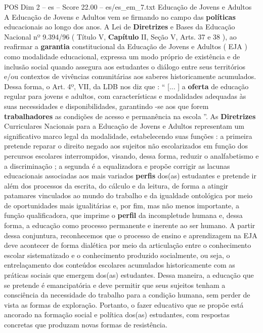 \begin{textsample}{POS Dim 2 – es – Score 22.00 – es/es\_em\_7.txt}  \label{ex:f2_pos_213}
Educação de Jovens e Adultos A Educação de Jovens e Adultos vem se firmando no campo das \textbf{políticas} educacionais ao longo dos anos.
A Lei de \textbf{Diretrizes} e Bases da Educação Nacional nº 9.394/96 ( Título V, \textbf{Capítulo} II, Seção V, Arts. 37 e 38 ), ao reafirmar a \textbf{garantia} constitucional da Educação de Jovens e Adultos ( EJA ) como modalidade educacional, expressa um modo próprio de existência e de inclusão social quando assegura aos estudantes o diálogo entre seus territórios e/ou contextos de vivências comunitárias aos saberes historicamente acumulados.
Dessa forma, o Art. 4º, VII, da LDB nos diz que : “ [... ] a \textbf{oferta} de educação regular para jovens e adultos, com características e modalidades adequadas às suas necessidades e disponibilidades, garantindo -se aos que forem \textbf{trabalhadores} as condições de acesso e permanência na escola ”.
As \textbf{Diretrizes} Curriculares Nacionais para a Educação de Jovens e Adultos representam um significativo marco legal da modalidade, estabelecendo suas funções : a primeira pretende reparar o direito negado aos sujeitos não escolarizados em função dos percursos escolares interrompidos, visando, dessa forma, reduzir o analfabetismo e a discriminação ; a segunda é a equalizadora e propõe corrigir as lacunas educacionais associadas aos mais variados \textbf{perfis} dos(as) estudantes e pretende ir além dos processos da escrita, do cálculo e da leitura, de forma a atingir patamares vinculados ao mundo do trabalho e da igualdade ontológica por meio de oportunidades mais igualitárias e, por fim, mas não menos importante, a função qualificadora, que imprime o \textbf{perfil} da incompletude humana e, dessa forma, a educação como processo permanente e inerente ao ser humano.
A partir dessa conjuntura, reconhecemos que o processo de ensino e aprendizagem na EJA deve acontecer de forma dialética por meio da articulação entre o conhecimento escolar sistematizado e o conhecimento produzido socialmente, ou seja, o entrelaçamento dos conteúdos escolares acumulados historicamente com as práticas sociais que emergem dos(as) estudantes.
Dessa maneira, a educação que se pretende é emancipatória e deve permitir que seus sujeitos tenham a consciência da necessidade do trabalho para a condição humana, sem perder de vista as formas de exploração.
Portanto, o fazer educativo que se propõe está ancorado na formação social e política dos(as) estudantes, com respostas concretas que produzam novas formas de resistência.

\end{textsample}
